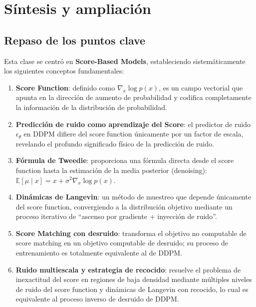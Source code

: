 \section{Síntesis y ampliación}

\subsection{Repaso de los puntos clave}

Esta clase se centró en \textbf{Score-Based Models}, estableciendo sistemáticamente los siguientes conceptos fundamentales:

\begin{enumerate}
    \item \textbf{Score Function}: definido como $\nabla_x \log p(x)$, es un campo vectorial que apunta en la dirección de aumento de probabilidad y codifica completamente la información de la distribución de probabilidad.

    \item \textbf{Predicción de ruido como aprendizaje del Score}: el predictor de ruido $\epsilon_\theta$ en DDPM difiere del score function únicamente por un factor de escala, revelando el profundo significado físico de la predicción de ruido.

    \item \textbf{Fórmula de Tweedie}: proporciona una fórmula directa desde el score function hasta la estimación de la media posterior (denoising): $\mathbb{E}[\mu \mid x] = x + \sigma^2 \nabla_x \log p(x)$.

    \item \textbf{Dinámicas de Langevin}: un método de muestreo que depende únicamente del score function, convergiendo a la distribución objetivo mediante un proceso iterativo de ``ascenso por gradiente + inyección de ruido''.

    \item \textbf{Score Matching con desruido}: transforma el objetivo no computable de score matching en un objetivo computable de desruido; su proceso de entrenamiento es totalmente equivalente al de DDPM.

    \item \textbf{Ruido multiescala y estrategia de recocido}: resuelve el problema de inexactitud del score en regiones de baja densidad mediante múltiples niveles de ruido del score function y dinámicas de Langevin con recocido, lo cual es equivalente al proceso inverso de desruido de DDPM.
\end{enumerate}

